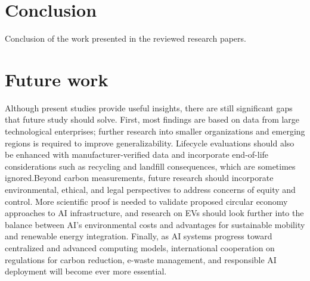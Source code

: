 \documentclass[a4paper, 12pt]{article}
\begin{document}
\section{Conclusion}
Conclusion of the work presented in the reviewed research papers.

\section{Future work}
Although present studies provide useful insights, there are still significant gaps that future study should solve.  First, most findings are based on data from large technological enterprises; further research into smaller organizations and emerging regions is required to improve generalizability.  Lifecycle evaluations should also be enhanced with manufacturer-verified data and incorporate end-of-life considerations such as recycling and landfill consequences, which are sometimes ignored.Beyond carbon measurements, future research should incorporate environmental, ethical, and legal perspectives to address concerns of equity and control.  More scientific proof is needed to validate proposed circular economy approaches to AI infrastructure, and research on EVs should look further into the balance between AI's environmental costs and advantages for sustainable mobility and renewable energy integration.  Finally, as AI systems progress toward centralized and advanced computing models, international cooperation on regulations for carbon reduction, e-waste management, and responsible AI deployment will become ever more essential.

\printbibliography
\end{document}
